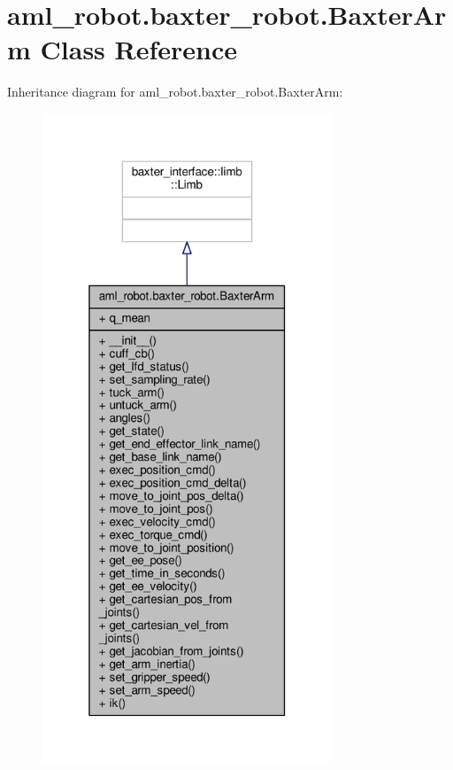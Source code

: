 \hypertarget{classaml__robot_1_1baxter__robot_1_1_baxter_arm}{\section{aml\-\_\-robot.\-baxter\-\_\-robot.\-Baxter\-Arm Class Reference}
\label{classaml__robot_1_1baxter__robot_1_1_baxter_arm}
}


Inheritance diagram for aml\-\_\-robot.\-baxter\-\_\-robot.\-Baxter\-Arm\-:\nopagebreak
\begin{figure}[H]
\begin{center}
\leavevmode
\includegraphics[height=550pt]{classaml__robot_1_1baxter__robot_1_1_baxter_arm__inherit__graph}
\end{center}
\end{figure}


